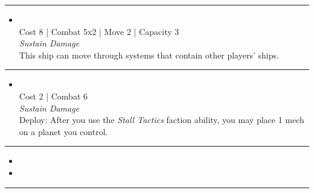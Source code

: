 \begin{multicols}{2}
\vspace{-10pt}\rule{\hsize}{0.4pt}\vspace{5pt}


\begin{itemize}
\item {}\\
Cost 8 | Combat 5x2 | Move 2 | Capacity 3 \\
\emph{Sustain Damage}\\
This ship can move through systems that contain other players' ships.
\end{itemize}

\vspace{-10pt}\rule{\hsize}{0.4pt}\vspace{5pt}


\begin{itemize}
\item {} %
\\
Cost 2 | Combat 6
\\
\emph{Sustain Damage}
\\
Deploy: After you use the \emph{Stall Tactics} faction ability, you may place 1 mech on a planet you control. 
\end{itemize}

\vspace{-10pt}\rule{\hsize}{0.4pt}\vspace{5pt}

\nounits

\columnbreak
{}

\begin{itemize}
\item \transparasteel
\item \mageon
\end{itemize}

\vspace{-10pt}\rule{\hsize}{0.4pt}\vspace{5pt}



\end{multicols}
